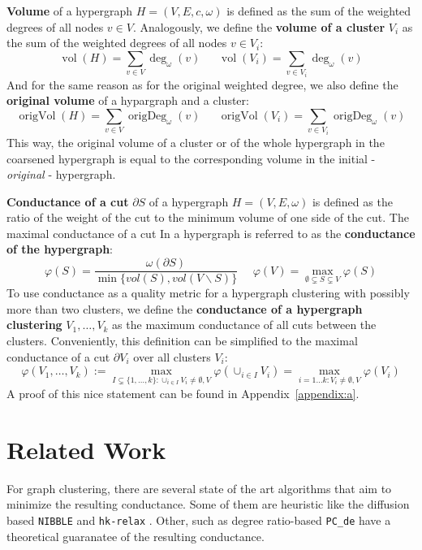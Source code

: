 \documentclass[acmsmall,nonacm,screen,review]{acmart}
\DeclareMathOperator{\vol}{vol}
\DeclareMathOperator{\origVol}{origVol}
\DeclareMathOperator{\origDeg}{origDeg}
\begin{document}
\smallbreak
\noindent\textbf{Volume} of a hypergraph $H = (V, E, c, \omega)$ is 
defined as the sum of the weighted degrees of all nodes $v \in V$. 
Analogously, we define the \textbf{volume of a cluster} $V_i$ as the 
sum of the weighted degrees of all nodes $v \in V_i$:
\[\vol(H) = \sum_{v \in V} \deg_\omega(v) \ \ \ \ \ \ \
\vol(V_i) = \sum_{v \in V_i} \deg_\omega(v)\]
And for the same reason as for the original weighted degree, we also 
define the \textbf{original volume} of a hypargraph and a cluster:
\[\origVol(H) = \sum_{v \in V} \origDeg_\omega(v) \ \ \ \ \ \ \
\origVol(V_i) = \sum_{v \in V_i} \origDeg_\omega(v)\]
This way, the original volume of a cluster or of the whole hypergraph 
in the coarsened hypergraph is equal to the corresponding volume in 
the initial - \textit{original} - hypergraph.

\smallbreak
\noindent\textbf{Conductance of a cut} $\partial S$ of a hypergraph 
$H = (V, E, \omega)$ is defined as the ratio of the weight of the cut 
to the minimum volume of one side of the cut. The maximal conductance 
of a cut In a hypergraph is referred to as the 
\textbf{conductance of the hypergraph}: 
\[{\varphi(S)} = \frac{\omega(\partial S)}{\min\{vol(S), vol(V \backslash S)\}}
\ \ \ \ \ \ 
{\varphi(V)} = \max_{\emptyset \subsetneq S \subsetneq V} \varphi(S)
\]
To use conductance as a quality metric for a hypergraph clustering 
with possibly more than two clusters, we define the 
\textbf{conductance of a hypergraph clustering} $V_1, \dots, V_k$ as 
the maximum conductance of all cuts between the clusters. 
Conveniently, this definition can be simplified to the maximal 
conductance of a cut $\partial V_i$ over all clusters $V_i$:
\[\varphi(V_1, \dots, V_k) 
:= \max_{I \subsetneq \{1, \dots, k\}:
                            \cup_{i \in I} V_i \neq \emptyset, V}
        \varphi(\cup_{i \in I} V_i) 
 = \max_{i = 1 \dots k: V_i \neq \emptyset, V} \varphi(V_i)\]
A proof of this nice statement can be found in Appendix~\ref{appendix:a}.

\section{Related Work}
\label{sec:related_work}

For graph clustering, there are several state of the art algorithms 
that aim to minimize the resulting conductance. Some of them are 
heuristic like the diffusion based \texttt{NIBBLE} \cite{Nibble} and 
\texttt{hk-relax} \cite{HKRelax}. Other, such as degree ratio-based 
\texttt{PC\_de} \cite{PCde} have a theoretical guaranatee of the 
resulting conductance. 
\end{document}

